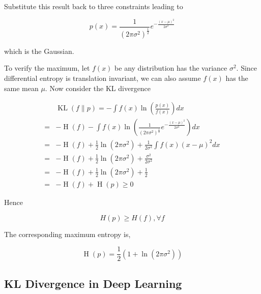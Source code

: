 \documentclass{article}
\begin{document}
            Substitute this result back to three constraints leading to

            \begin{equation*}
                 p(x) = \frac{1}{ (2 \pi \sigma^2)^{\frac{1}{2}} } e^{ -\frac{(x - \mu)^2}{2 \sigma^2} }
            \end{equation*}

            which is the Gaussian.

            To verify the maximum, let $ f(x) $ be any distribution has the
            variance $ \sigma^2 $. Since differential entropy is translation invariant, we can also assume
            $ f(x) $ has the same mean $ \mu $. Now consider the KL divergence

            \begin{align*}
                & \operatorname{KL}(f \| p) = -\int f(x) \ln \left( \frac{p(x)}{f(x)} \right) dx \\
                =& -\operatorname{H}(f) - \int f(x) \ln \left(
                     \frac{1}{ (2 \pi
                     \sigma^2)^{\frac{1}{2}} } e^{
                 -\frac{(x - \mu)^2}{2 \sigma^2} } 
                \right) dx \\
                =& -\operatorname{H}(f) + \frac{1}{2} \ln (2 \pi \sigma^{2}) +
                \frac{1}{2 \sigma^{2}} \int f(x) (x - \mu)^{2} dx \\
                =& -\operatorname{H}(f) + \frac{1}{2} \ln (2 \pi \sigma^{2}) + \frac{\sigma^{2}}{2 \sigma^{2}} \\
                =& -\operatorname{H}(f) + \frac{1}{2} \ln (2 \pi \sigma^{2}) + \frac{1}{2} \\
                =& -\operatorname{H}(f) + \operatorname{H}(p) \geq 0
            \end{align*}

            Hence

            \begin{equation*}
                 H(p) \geq H(f), \forall f
            \end{equation*}

            The corresponding maximum entropy is,

            \begin{equation*}
                 \operatorname{H}(p) = \frac{1}{2} (1 + \ln(2 \pi \sigma^2))
            \end{equation*}

        \subsection{KL Divergence in Deep Learning}
\end{document}

